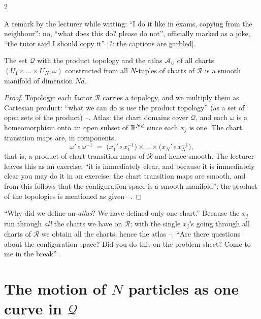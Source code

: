\begin{paracol}{2}
\begin{aside}\label{as:mp-joke}
A remark by the lecturer while writing: ``I do it like in exams, copying from the neighbour'': no, ``what does this do? please do not'', officially marked as a joke, ``the tutor said I should copy it'' [?: the captions are garbled]. 
\end{aside}

\begin{theorem}\label{thm:mp-smooth}
The set $\mathcal Q$ with the product topology and the atlas $\mathcal A_{\mathcal Q}$ of all charts $(U_1\times\dots\times U_N,\omega)$ constructed from all $N$-tuples of charts of $\mathcal R$ is a smooth manifold of dimension $Nd$.
\end{theorem}
\begin{proof}
Topology: each factor $\mathcal R$ carries a topology, and we multiply them as Cartesian product: ``what we can do is use the product topology'' (as a set of open sets of the product) --. Atlas: the chart domains cover $\mathcal Q$, and each $\omega$ is a homeomorphism onto an open subset of $\mathbb{R}^{Nd}$ since each $x_j$ is one. The chart transition maps are, in components,
\[
  \omega'\circ\omega^{-1}\;=\;\bigl(x_1'\circ x_1^{-1}\bigr)\times\dots\times\bigl(x_N'\circ x_N^{-1}\bigr),
\]
that is, a product of chart transition maps of $\mathcal R$ and hence smooth. The lecturer leaves this as an exercise: ``it is immediately clear, and because it is immediately clear you may do it in an exercise: the chart transition maps are smooth, and from this follows that the configuration space is a smooth manifold''; the product of the topologies is mentioned as given --. \qedhere
\end{proof}

``Why did we define an \emph{atlas}? We have defined only one chart.'' Because the $x_j$ run through \emph{all} the charts we have on $\mathcal R$; with the single $x_j$'s going through all charts of $\mathcal R$ we obtain all the charts, hence the atlas --. ``Are there questions about the configuration space? Did you do this on the problem sheet? Come to me in the break'' .

\section{The motion of $N$ particles as one curve in $\mathcal Q$}\label{sec:mp-curve}


\end{paracol}
